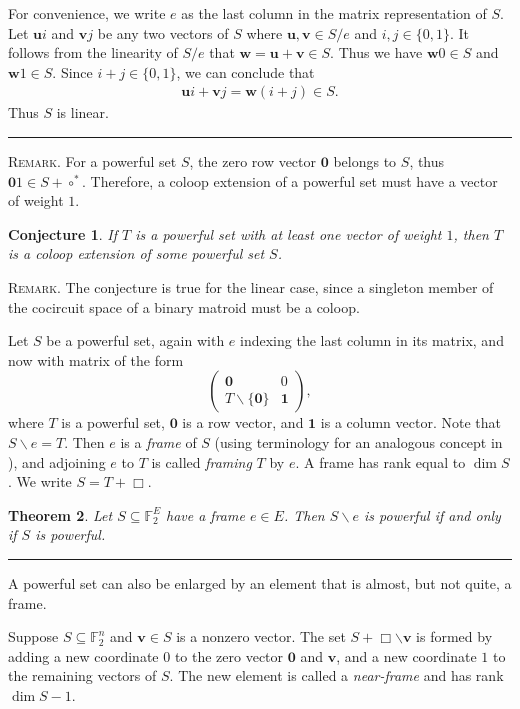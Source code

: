 \documentclass[12pt]{article}
\newtheorem{thm}{Theorem}[section]
\newtheorem{con}[thm]{Conjecture}
\def\pf{\noindent {\it Proof.\ }}
\def\qed{\hfill \rule{4pt}{7pt}}
\begin{document}
\pf  For convenience, we write $e$ as the last column in the matrix representation of $S$.
Let $\mathbf{u}i$ and $\mathbf{v}j$ be any two vectors of $S$ where $\mathbf{u},\mathbf{v}\in S/e$ and $i,j\in\{0,1\}$.  It follows from the linearity of $S/e$ that $\mathbf{w}=\mathbf{u}+\mathbf{v}\in S$.  Thus we have $\mathbf{w}0\in S$ and $\mathbf{w}1\in S$.  Since $i+j\in\{0,1\}$, we can conclude that
\begin{align*}
\mathbf{u}i+\mathbf{v}j=\mathbf{w}(i+j)\in S.
\end{align*}
Thus $S$ is linear. \qed

\textsc{Remark.}  For a powerful set $S$, the zero row vector $\mathbf{0}$ belongs to $S$, thus $\mathbf{0}1\in S+\circ^*$.  Therefore, a coloop extension of a powerful set must have a vector of weight $1$.

\begin{con}\label{conjdup}
If $T$ is a powerful set with at least one vector of weight $1$, then $T$ is a coloop extension
of some powerful set $S$.
\end{con}

\textsc{Remark.} The conjecture is true for the linear case, since a singleton member of the
cocircuit space of a binary matroid must be a coloop.

Let $S$ be a powerful set, again with $e$ indexing the last column in its matrix, and now
with matrix of the form
\[
\left(
\begin{array}{cc}
\mathbf{0} & 0   \\
T\backslash\{\mathbf{0}\} & \mathbf{1}
\end{array}
\right) ,
\]
where $T$ is a powerful set, $\mathbf{0}$ is a row vector, and $\mathbf{1}$ is a column vector.  Note that $S\backslash e=T$.
Then $e$ is a \textit{frame} of $S$ (using terminology for an analogous concept
in \cite{welsh-whittle99}), and adjoining $e$ to $T$ is called \textit{framing} $T$ by $e$.
A frame has rank equal to $\dim S$.  We write $S=T+\Box$.

\begin{thm}\label{frame}
Let $S\subseteq\mathbb{F}_2^E$ have a frame $e\in E$.  Then $S\backslash e$ is powerful if and only if
$S$ is powerful.
\qed
\end{thm}

A powerful set can also be enlarged by an element that is almost, but not quite, a frame.

Suppose $S\subseteq\mathbb{F}_2^n$ and $\mathbf{v}\in S$ is a nonzero vector.
The set $S+\Box\backslash\mathbf{v}$ is formed by adding a new coordinate $0$ to the zero
vector $\mathbf{0}$ and $\mathbf{v}$, and a new coordinate $1$ to the remaining vectors of $S$.
The new element is called a \textit{near-frame} and has rank $\dim S-1$.
\end{document}
